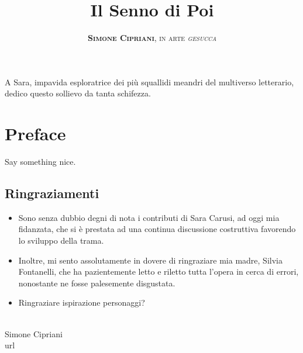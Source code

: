 \documentclass[11pt]{book}
\title{
	\Huge \textbf{Il Senno di Poi}
}
\author{
	\textsc{\textbf{Simone Cipriani}, in arte \textit{gesucca}}
}
\newenvironment{dedication} {
	\cleardoublepage\thispagestyle{empty}
	\vspace*{\stretch{1}}
	\hfill\begin{minipage}[t]{0.66\textwidth}
	\raggedright}
{
	\end{minipage}
	\vspace*{\stretch{3}}
	\clearpage
}
\begin{document}
\frontmatter
\maketitle
\begin{dedication}
	A Sara, impavida esploratrice dei più squallidi meandri del multiverso letterario, dedico questo sollievo da tanta schifezza.
\end{dedication}

\mainmatter\chapter*{Preface}

Say something nice.

\section*{Ringraziamenti}
\begin{itemize}
	\item Sono senza dubbio degni di nota i contributi di Sara Carusi, ad oggi mia fidanzata, che si è prestata ad una continua discussione costruttiva favorendo lo sviluppo della trama.
	\item Inoltre, mi sento assolutamente in dovere di ringraziare mia madre, Silvia Fontanelli, che ha pazientemente letto e riletto tutta l'opera in cerca di errori, nonostante ne fosse palesemente disgustata.
	\item Ringraziare ispirazione personaggi?
\end{itemize}
\mbox{} \\
\noindent Simone Cipriani \\
\noindent url

\newpage
\tableofcontents
\newpage





















\end{document}
